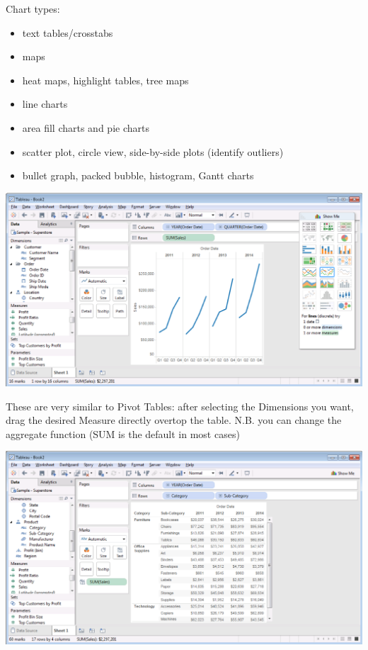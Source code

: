 \documentclass[xcolor=svgnames]{beamer} %
\begin{document}
\begin{frame}
Chart types:

\begin{itemize}
\item  text tables/crosstabs
\item  maps
\item  heat maps, highlight tables, tree maps
\item  line charts
\item  area fill charts and pie charts
\item  scatter plot, circle view, side-by-side plots (identify outliers)
\item  bullet graph, packed bubble, histogram, Gantt charts
\end{itemize}
\end{frame}

\begin{frame}
\begin{center}
\includegraphics[width=.9\textwidth]{img/line}
\end{center}
\end{frame}

\begin{frame}\label{crosstab}
These are very similar to Pivot Tables: after selecting the Dimensions you want, drag the desired Measure directly overtop the table.  N.B. you can change the aggregate function (SUM is the default in most cases)
\begin{center}
\includegraphics[width=.9\textwidth]{img/crosstab}
\end{center}
\end{frame}
\end{document}
